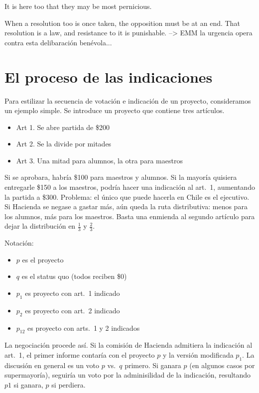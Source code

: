 It is here too that they may be most pernicious.


When a resolution too is once taken, the opposition must be at an end. That resolution is a law, and resistance to it is punishable. --> EMM la urgencia opera contra esta delibaración benévola...

\section{El proceso de las indicaciones}

Para estilizar la secuencia de votación e indicación de un proyecto, consideramos un ejemplo simple. Se introduce un proyecto que contiene tres artículos. 

\begin{itemize}
\item Art 1. Se abre partida de \$200
\item Art 2. Se la divide por mitades
\item Art 3. Una mitad para alumnos, la otra para maestros
\end{itemize}

\noindent Si se aprobara, habría \$100 para maestros y alumnos. Si la mayoría quisiera entregarle \$150 a los maestros, podría hacer una indicación al art.\ 1, aumentando la partida a \$300. Problema: el único que puede hacerla en Chile es el ejecutivo. Si Hacienda se negase a gastar más, aún queda la ruta distributiva: menos para los alumnos, más para los maestros. Basta una enmienda al segundo artículo para dejar la distribución en $\frac{1}{3}$ y $\frac{2}{3}$. 

Notación:
\begin{itemize}
\item $p$ es el proyecto
\item $q$ es el status quo (todos reciben \$0)
\item $p_1$ es proyecto con art.\ 1 indicado
\item $p_2$ es proyecto con art.\ 2 indicado
\item $p_{12}$ es proyecto con arts.\ 1 y 2 indicados
\end{itemize}

La negociación procede así. Si la comisión de Hacienda admitiera la indicación al art.\ 1, el primer informe contaría con el proyecto $p$ y la versión modificada $p_1$. La discusión en general es un voto $p$ vs.\ $q$ primero. Si ganara $p$ (en algunos casos por supermayoría), seguiría un voto por la adminisilidad de la indicación, resultando $p1$ si ganara, $p$ si perdiera.

